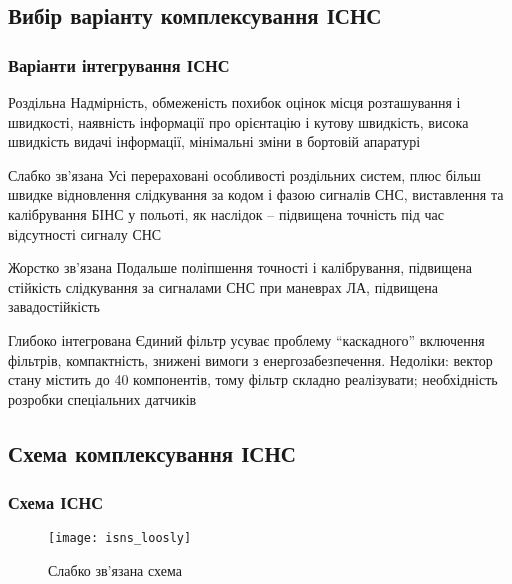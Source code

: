 \documentclass[ucs]{beamer}    %
\begin{document}
\subsection{Вибір варіанту комплексування ІСНС } 
\begin{frame}\frametitle{Варіанти інтегрування ІСНС} 

\tiny
\begin{block}{Роздільна}
Надмірність, обмеженість похибок оцінок місця розташування і швидкості, 
наявність інформації про орієнтацію і кутову швидкість, висока швидкість видачі інформації, 
мінімальні зміни в бортовій апаратурі
\end{block}

\begin{exampleblock}{Слабко зв'язана}
Усі перераховані особливості роздільних систем, плюс більш 
швидке відновлення слідкування за кодом і фазою сигналів СНС, виставлення та калібрування 
БІНС у польоті, як наслідок -- підвищена точність під час відсутності сигналу СНС
\end{exampleblock}


\begin{block}{Жорстко зв'язана}
Подальше поліпшення точності і калібрування, підвищена стійкість слідкування 
за сигналами СНС при маневрах ЛА, підвищена завадостійкість 
\end{block}

\begin{block}{Глибоко інтегрована}
Єдиний фільтр усуває проблему ``каскадного'' включення 
фільтрів, компактність, знижені вимоги з енергозабезпечення. Недоліки: вектор стану 
містить до 40 компонентів, тому фільтр складно реалізувати; необхідність розробки 
спеціальних датчиків 
\end{block}
\end{frame}


\subsection{Схема комплексування ІСНС }
\begin{frame} \frametitle{Схема ІСНС} 
\begin{figure}[here]
\centering
\texttt{[image: isns\_loosly]}
\caption{Слабко зв’язана схема}
\end{figure}
\end{frame}
\end{document}

